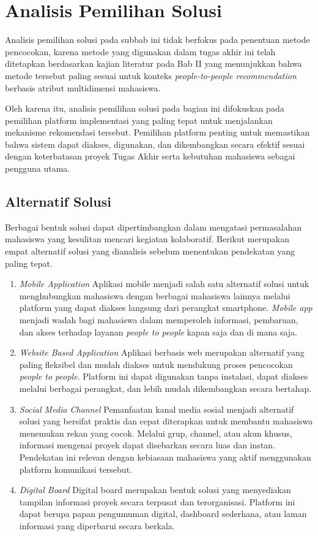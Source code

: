 \section{Analisis Pemilihan Solusi}
Analisis pemilihan solusi pada subbab ini tidak berfokus pada penentuan metode pencocokan, karena metode yang digunakan dalam tugas akhir ini telah ditetapkan berdasarkan kajian literatur pada Bab II yang menunjukkan bahwa metode tersebut paling sesuai untuk konteks \textit{people-to-people recommendation} berbasis atribut multidimensi mahasiswa.

Oleh karena itu, analisis pemilihan solusi pada bagian ini difokuskan pada pemilihan platform implementasi yang paling tepat untuk menjalankan mekanisme rekomendasi tersebut. Pemilihan platform penting untuk memastikan bahwa sistem dapat diakses, digunakan, dan dikembangkan secara efektif sesuai dengan keterbatasan proyek Tugas Akhir serta kebutuhan mahasiswa sebagai pengguna utama.

\subsection{Alternatif Solusi}
Berbagai bentuk solusi dapat dipertimbangkan dalam mengatasi permasalahan mahasiswa yang kesulitan mencari kegiatan kolaboratif. Berikut merupakan empat alternatif solusi yang dianalisis sebelum menentukan pendekatan yang paling tepat.
\begin{enumerate}
\item {\textit{Mobile Application}} 
Aplikasi mobile menjadi salah satu alternatif solusi untuk menghubungkan mahasiswa dengan berbagai mahasiswa lainnya melalui platform yang dapat diakses langsung dari perangkat smartphone. \textit{Mobile app} menjadi wadah bagi mahasiswa dalam memperoleh informasi, pembaruan, dan akses terhadap layanan \textit{people to people} kapan saja dan di mana saja.
\item {\textit{Website Based Application}}
Aplikasi berbasis web merupakan alternatif yang paling fleksibel dan mudah diakses untuk mendukung proses pencocokan \textit{people to people}. Platform ini dapat digunakan tanpa instalasi, dapat diakses melalui berbagai perangkat, dan lebih mudah dikembangkan secara bertahap. 
\item {\textit{Social Media Channel}}
Pemanfaatan kanal media sosial menjadi alternatif solusi yang bersifat praktis dan cepat diterapkan untuk membantu mahasiswa menemukan rekan yang cocok. Melalui grup, channel, atau akun khusus, informasi mengenai proyek dapat disebarkan secara luas dan instan. Pendekatan ini relevan dengan kebiasaan mahasiswa yang aktif menggunakan platform komunikasi tersebut.
\item {\textit{Digital Board}}
Digital board merupakan bentuk solusi yang menyediakan tampilan informasi proyek secara terpusat dan terorganisasi. Platform ini dapat berupa papan pengumuman digital, dashboard sederhana, atau laman informasi yang diperbarui secara berkala. 
\end{enumerate}

